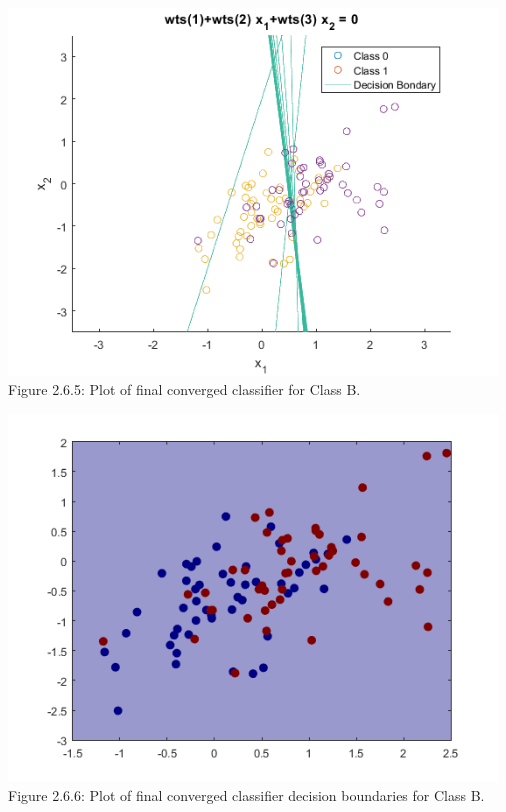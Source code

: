\documentclass[]{report}   %
\begin{document}
\begin{center}
	\includegraphics[width=35em]{2_6_Figure_5.png}
	{Figure 2.6.5: Plot of final converged classifier for Class B.}
\end{center} 


\begin{center}
	\includegraphics[width=35em]{2_6_Figure_6.png}
	{Figure 2.6.6: Plot of final converged classifier decision boundaries for Class B.}
\end{center} 
\end{document}
